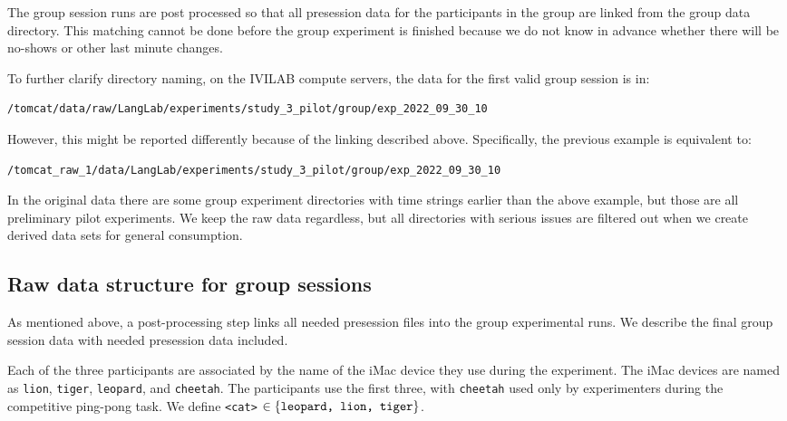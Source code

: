 The group session runs are post processed so that all presession data for the
participants in the group are linked from the group data directory. This
matching cannot be done before the group experiment is finished because we do
not know in advance whether there will be no-shows or other last minute
changes.

To further clarify directory naming, on the IVILAB compute servers,
the data for the first valid group session is in:
%
\begin{verbatim}
/tomcat/data/raw/LangLab/experiments/study_3_pilot/group/exp_2022_09_30_10
\end{verbatim}
However, this might be reported  differently because of the linking described
above. Specifically, the previous example is equivalent to:
%
\begin{verbatim}
/tomcat_raw_1/data/LangLab/experiments/study_3_pilot/group/exp_2022_09_30_10
\end{verbatim}
%
In the original data there are some group experiment directories with time
strings earlier than the above example, but those are all preliminary pilot
experiments. We keep the raw data regardless, but all directories with serious
issues are filtered out when we create derived data sets for general
consumption.

\subsection{Raw data structure for group sessions}

As mentioned above, a post-processing step links all needed presession files into
the group experimental runs. We describe the final group session data with
needed presession data included.


Each of the three participants are associated by the name of the iMac device
they use during the experiment.
The iMac devices are named as \verb|lion|, \verb|tiger|,
\verb|leopard|, and \verb|cheetah|. The participants use the first three, with
\verb|cheetah| used only by experimenters during the competitive ping-pong
task.
We define \verb|<cat>| $\in \{\text{\texttt{leopard, lion, tiger}}\}$.

